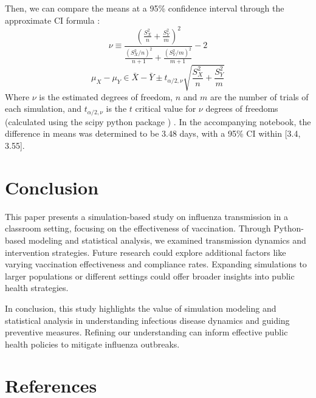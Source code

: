 \documentclass[
	letterpaper, %
]{jdf}
\begin{document}
Then, we can compare the means at a 95\% confidence interval through the approximate CI formula \citep{goldsman2020}:
\[\nu \equiv \frac{\left(\frac{S_X^2}{n}+\frac{S_Y^2}{m}\right)^2}{\frac{\left(S_X^2 / n\right)^2}{n+1}+\frac{\left(S_Y^2 / m\right)^2}{m+1}}-2\]
\[\mu_X-\mu_Y \in \bar{X}-\bar{Y} \pm t_{\alpha / 2, \nu} \sqrt{\frac{S_X^2}{n}+\frac{S_Y^2}{m}}\]
Where \(\nu\) is the estimated degrees of freedom, \(n\) and \(m\) are the number of trials of each simulation, and \(t_{\alpha / 2, \nu}\) is the \(t\) critical value for \(\nu\) degrees of freedoms (calculated using the scipy python package \citep{2020SciPy-NMeth}) .
In the accompanying notebook, the difference in means was determined to be 3.48 days, with a 95\% CI within [3.4, 3.55]. 
\section{Conclusion}
This paper presents a simulation-based study on influenza transmission in a classroom setting, focusing on the effectiveness of vaccination. Through Python-based modeling and statistical analysis, we examined transmission dynamics and intervention strategies.
Future research could explore additional factors like varying vaccination effectiveness and compliance rates. Expanding simulations to larger populations or different settings could offer broader insights into public health strategies.

In conclusion, this study highlights the value of simulation modeling and statistical analysis in understanding infectious disease dynamics and guiding preventive measures. Refining our understanding can inform effective public health policies to mitigate influenza outbreaks.

\section{References}
\printbibliography[heading=none]
\end{document}
